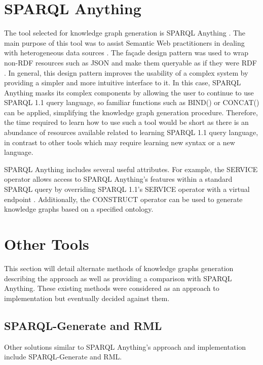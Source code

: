 \section{SPARQL Anything}
\hspace{0.5cm} The tool selected for knowledge graph generation is SPARQL Anything \cite{sparqlanythinggithub}. The main purpose of this tool was to assist Semantic Web practitioners in dealing with heterogeneous data sources \cite{asprino2023knowledge}. The fa\c{c}ade design pattern was used to wrap non-RDF resources such as JSON and make them queryable as if they were RDF \cite{sparqlanything}. In general, this design pattern improves the usability of a complex system by providing a simpler and more intuitive interface to it. In this case, SPARQL Anything masks its complex components by allowing the user to continue to use SPARQL 1.1 query language, so familiar functions such as BIND() or CONCAT() can be applied, simplifying the knowledge graph generation procedure. Therefore, the time required to learn how to use such a tool would be short as there is an abundance of resources available related to learning SPARQL 1.1 query language, in contrast to other tools which may require learning new syntax or a new language. 

SPARQL Anything includes several useful attributes. For example, the SERVICE operator allows access to SPARQL Anything's features within a standard SPARQL query by overriding SPARQL 1.1's SERVICE operator with a virtual endpoint \cite{asprino2023knowledge}. Additionally, the CONSTRUCT operator can be used to generate knowledge graphs based on a specified ontology. 

\section{Other Tools}
\hspace{0.5cm} This section will detail alternate methods of knowledge graphs generation describing the approach as well as providing a comparison with SPARQL Anything. These existing methods were considered as an approach to implementation but eventually decided against them. 

\subsection{SPARQL-Generate and RML}
\hspace{0.5cm} Other solutions similar to SPARQL Anything's approach and implementation include SPARQL-Generate and RML. 


